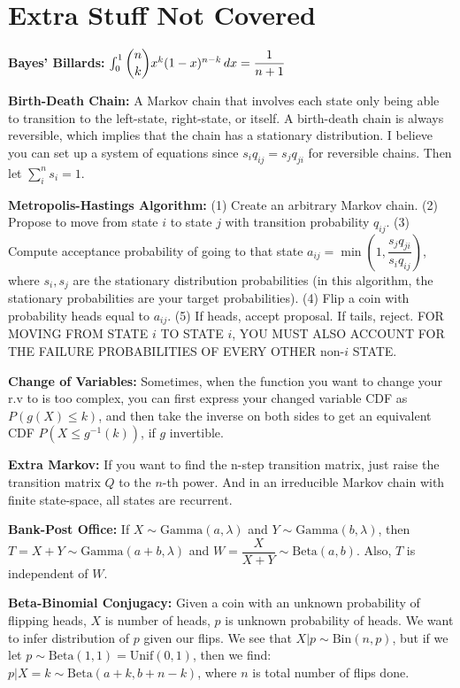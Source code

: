 \documentclass[letterpaper]{article}
\begin{document}
\section*{Extra Stuff Not Covered}
\textbf{Bayes' Billards:} $\int_{0}^{1} \dbinom{n}{k} x^k (1-x)^{n-k} \, dx = \dfrac{1}{n+1}$

\noindent
\textbf{Birth-Death Chain:} A Markov chain that involves each state only being able to transition to the left-state, right-state, or itself. A birth-death chain is always reversible, which implies that the chain has a stationary distribution. I believe you can set up a system of equations since $s_i q_{ij} = s_j q_{ji}$ for reversible chains. Then let $\sum_{i}^{n} s_i = 1$. 

\noindent
\textbf{Metropolis-Hastings Algorithm:} (1) Create an arbitrary Markov chain. (2) Propose to move from state $i$ to state $j$ with transition probability $q_{ij}$. (3) Compute acceptance probability of going to that state $a_{ij} = \min \left( 1, \dfrac{s_{j}q_{ji}}{s_{i}q_{ij}} \right)$, where $s_i,s_j$ are the stationary distribution probabilities (in this algorithm, the stationary probabilities are your target probabilities). (4) Flip a coin with probability heads equal to $a_{ij}$. (5) If heads, accept proposal. If tails, reject. FOR MOVING FROM STATE $i$ TO STATE $i$, YOU MUST ALSO ACCOUNT FOR THE FAILURE PROBABILITIES OF EVERY OTHER non-$i$ STATE. 

\noindent
\textbf{Change of Variables:} Sometimes, when the function you want to change your r.v to is too complex, you can first express your changed variable CDF as $P(g(X) \leq k)$, and then take the inverse on both sides to get an equivalent CDF $P(X \leq g^{-1}(k))$, if $g$ invertible. 

\noindent
\textbf{Extra Markov:} If you want to find the n-step transition matrix, just raise the transition matrix $Q$ to the $n$-th power. And in an irreducible Markov chain with finite state-space, all states are recurrent. 

\noindent
\textbf{Bank-Post Office:} If $X \sim \mbox{Gamma}(a,\lambda)$ and $Y \sim \mbox{Gamma}(b,\lambda)$, then $T = X+Y \sim \mbox{Gamma}(a+b,\lambda)$ and $W = \dfrac{X}{X+Y} \sim \mbox{Beta}(a,b)$. Also, $T$ is independent of $W$. 

\noindent
\textbf{Beta-Binomial Conjugacy:} Given a coin with an unknown probability of flipping heads, $X$ is number of heads, $p$ is unknown probability of heads. We want to infer distribution of $p$ given our flips. We see that $X|p \sim \mbox{Bin}(n,p)$, but if we let $p \sim \mbox{Beta}(1,1) = \mbox{Unif}(0,1)$, then we find: $p|X=k \sim \mbox{Beta}(a+k, b+n-k)$, where $n$ is total number of flips done.
\end{document}
